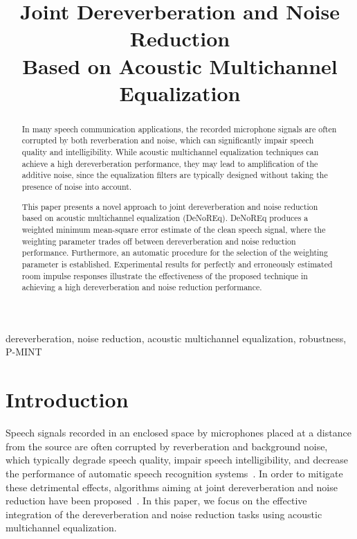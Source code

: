 \documentclass{article}
\title{Joint Dereverberation and Noise Reduction \\ Based on Acoustic Multichannel Equalization}
\def\ninept{\def\baselinestretch{.9}\let\normalsize\small\normalsize}
\begin{document}
\newlength\figureheight
\newlength\figurewidth
\setlength\figureheight{2.8cm}
\setlength{}
\ninept
%
\maketitle
%
\begin{abstract}

In many speech communication applications, the recorded microphone signals are often corrupted by both reverberation and noise, which can significantly impair speech quality and intelligibility. 
While acoustic multichannel equalization techniques can achieve a high dereverberation performance, they may lead to amplification of the additive noise, since the equalization filters are typically designed without taking the presence of noise into account. 

This paper presents a novel approach to joint dereverberation and noise reduction based on acoustic multichannel equalization (DeNoREq). 
DeNoREq produces a weighted minimum mean-square error estimate of the clean speech signal, where the weighting parameter trades off between dereverberation and noise reduction performance. 
Furthermore, an automatic procedure for the selection of the weighting parameter is established. 
Experimental results for perfectly and erroneously estimated room impulse responses illustrate the effectiveness of the proposed technique in achieving a high dereverberation and noise reduction performance.

\end{abstract}
%
\begin{keywords}
dereverberation, noise reduction, acoustic multichannel equalization, robustness, P-MINT
\end{keywords}
%
\section{Introduction}
\label{sec:intro}
Speech signals recorded in an enclosed space by microphones placed at a distance from the source are often corrupted by reverberation and background noise, which typically degrade speech quality, impair speech intelligibility, and decrease the performance of automatic speech recognition systems~\cite{Beutelmann_2006,Sehr_phd,Maas_ICASSP_2012}.
In order to mitigate these detrimental effects, algorithms aiming at joint dereverberation and noise reduction have been proposed~\cite{Doclo_IWAENC_2001,Delcroix_ITASLP_2007,Yoshioka_ITASLP_2009,Habets_ITASLP_2013,Braun_EUSIPCO_2013,Cauchi_Reverb_2014}. 
In this paper, we focus on the effective integration of the dereverberation and noise reduction tasks using acoustic multichannel equalization.
\end{document}
